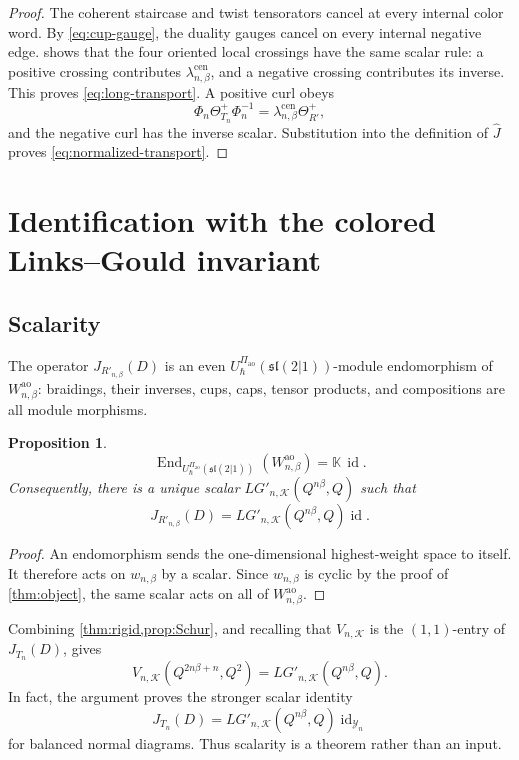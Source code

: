 \documentclass[11pt,a4paper]{article}
\newcommand{\hK}{\mathbb K}
\newcommand{\id}{\operatorname{id}}
\newcommand{\End}{\operatorname{End}}
\newcommand{\ao}{\mathrm{ao}}
\newcommand{\cen}{\mathrm{cen}}
\newtheorem{proposition}[theorem]{Proposition}
\theoremstyle{definition}
\theoremstyle{remark}
\begin{document}
\begin{proof}
The coherent staircase and twist tensorators cancel at every internal
color word.  By \eqref{eq:cup-gauge}, the duality gauges cancel on every
internal negative edge.   shows that the four
oriented local crossings have the same scalar rule: a positive crossing
contributes \(\lambda_{n,\beta}^{\cen}\), and a negative crossing
contributes its inverse.  This proves \eqref{eq:long-transport}.
A positive curl obeys
\[
 \Phi_n\Theta_{T_n}^+\Phi_n^{-1}
 =\lambda_{n,\beta}^{\cen}\Theta_{R'}^+,
\]
and the negative curl has the inverse scalar.  Substitution into the
definition of \(\widehat J\) proves \eqref{eq:normalized-transport}.
\end{proof}

\section{Identification with the colored Links--Gould invariant}
\label{sec:LG}

\subsection{Scalarity}

The operator \(J_{R'_{n,\beta}}(D)\) is an even
\(U_\hbar^{\Pi_{\ao}}(\mathfrak{sl}(2|1))\)-module endomorphism of
\(W_{n,\beta}^{\ao}\): braidings, their inverses, cups, caps, tensor
products, and compositions are all module morphisms.

\begin{proposition}\label{prop:Schur}
\[
 \End_{U_\hbar^{\Pi_{\ao}}(\mathfrak{sl}(2|1))}
 (W_{n,\beta}^{\ao})
 =\hK\,\id.
\]
Consequently, there is a unique scalar
\(LG'_{n,\mathcal K}(Q^{n\beta},Q)\) such that
\[
 J_{R'_{n,\beta}}(D)
 =LG'_{n,\mathcal K}(Q^{n\beta},Q)\id.
\]
\end{proposition}

\begin{proof}
An endomorphism sends the one-dimensional highest-weight space to itself.
It therefore acts on \(w_{n,\beta}\) by a scalar.  Since
\(w_{n,\beta}\) is cyclic by the proof of \cref{thm:object}, the same
scalar acts on all of \(W_{n,\beta}^{\ao}\).
\end{proof}

Combining \cref{thm:rigid,prop:Schur}, and recalling that
\(V_{n,\mathcal K}\) is the \((1,1)\)-entry of \(J_{T_n}(D)\), gives
\begin{equation}\label{eq:V-LGprime}
 V_{n,\mathcal K}(Q^{2n\beta+n},Q^2)
 =LG'_{n,\mathcal K}(Q^{n\beta},Q).
\end{equation}
In fact, the argument proves the stronger scalar identity
\[
 J_{T_n}(D)
 =LG'_{n,\mathcal K}(Q^{n\beta},Q)\id_{\mathcal Y_n}
\]
for balanced normal diagrams.  Thus scalarity is a theorem rather than
an input.
\end{document}

